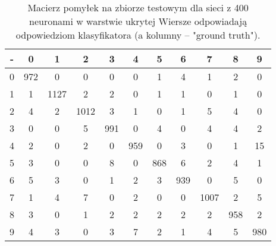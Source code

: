 \documentclass[a4paper]{article}
\begin{document}
\begin{table}[!hbt]
    \caption{Macierz pomyłek na zbiorze testowym dla sieci z 400 neuronami w warstwie ukrytej
    Wiersze odpowiadają odpowiedziom klasyfikatora (a kolumny -- "ground truth").
    \label{table:confusion2}
    }
\footnotesize
\begin{center}
    \begin{tabular}{ 
        |@{\hskip3pt}c@{\hskip3pt}
        |@{\hskip3pt}c@{\hskip3pt}
        |@{\hskip3pt}c@{\hskip3pt}
        |@{\hskip3pt}c@{\hskip3pt}
        |@{\hskip3pt}c@{\hskip3pt}
        |@{\hskip3pt}c@{\hskip3pt}
        |@{\hskip3pt}c@{\hskip3pt}
        |@{\hskip3pt}c@{\hskip3pt}
        |@{\hskip3pt}c@{\hskip3pt}
        |@{\hskip3pt}c@{\hskip3pt}
        |@{\hskip3pt}c@{\hskip3pt}|
        }
    \hline
- &         0&     1&     2&     3&     4&     5&     6&     7&     8&    9 \\
    \hline
0   & 972&     0 &    0&     0&     0&     1&     4&     1&     2&     0 \\
1   &   1&  1127 &    2&     2&     0&     1&     1&     0&     1&     0 \\
2   &   4&     2 & 1012&     3&     1&     0&     1&     5&     4&     0 \\
3   &   0&     0 &    5&   991&     0&     4&     0&     4&     4&     2 \\
4   &   2&     0 &    2&     0&   959&     0&     3&     0&     1&    15 \\
5   &   3&     0 &    0&     8&     0&   868&     6&     2&     4&     1 \\
6   &   5&     3 &    0&     1&     2&     3&   939&     0&     5&     0 \\
7   &   1&     4 &    7&     0&     2&     0&     0&  1007&     2&     5 \\
8   &   3&     0 &    1&     2&     2&     2&     2&     2&   958&     2 \\
9  &   4&     3 &    0&     3&     7&     2&     1&     4&     5&   980 \\
    \hline
    \end{tabular}
\end{center}
\end{table}
\end{document}
